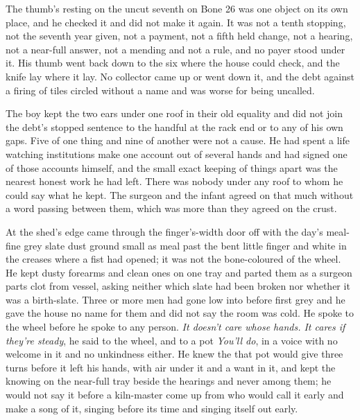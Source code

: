 The thumb's resting on the uncut seventh on Bone 26 was one object on its own place, and he checked it and did not make it again. It was not a tenth stopping, not the seventh year given, not a payment, not a fifth held change, not a hearing, not a near-full answer, not a mending and not a rule, and no payer stood under it. His thumb went back down to the six where the house could check, and the knife lay where it lay. No collector came up  or went down it, and the debt against a firing of tiles circled without a name and was worse for being uncalled.

The boy kept the two ears under one roof in their old equality and did not join the debt's stopped sentence to the handful at the rack end or to any of his own gaps. Five of one thing and nine of another were not a cause. He had spent a life watching institutions make one account out of several hands and had signed one of those accounts himself, and the small exact keeping of things apart was the nearest honest work he had left. There was nobody under any roof to whom he could say what he kept. The surgeon and the infant agreed on that much without a word passing between them, which was more than they agreed on the crust.

At the shed's edge  came through the finger's-width door off  with the day's meal-fine grey slate dust ground small as meal past the bent little finger and white in the creases where a fist had opened; it was not the bone-coloured  of the wheel. He kept dusty forearms and clean ones on one tray and parted them as a surgeon parts clot from vessel, asking neither which slate had been broken nor whether it was a birth-slate. Three or more men had gone low into  before first grey and he gave the house no name for them and did not say the room was cold. He spoke to the wheel before he spoke to any person. \emph{It doesn't care whose hands. It cares if they're steady}, he said to the wheel, and to a pot \emph{You'll do}, in a voice with no welcome in it and no unkindness either. He knew the  that pot would give three turns before it left his hands, with air under it and a want in it, and kept the knowing on the near-full tray beside the hearings and never among them; he would not say it before a kiln-master come up from  who would call it early and make a song of it, singing before its time and singing itself out early.

